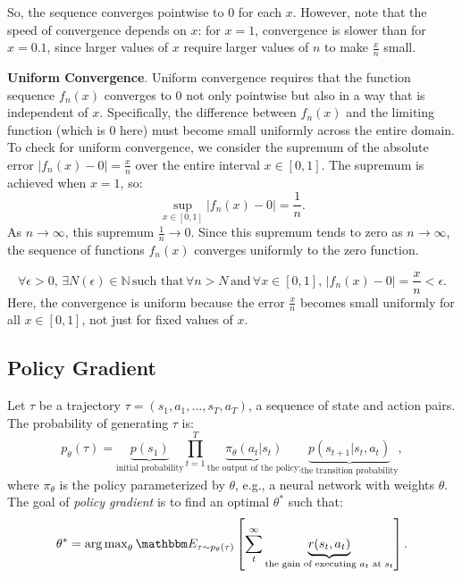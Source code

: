     So, the sequence converges pointwise to 0 for each $ x $. However, note that the speed of convergence depends on $ x $: for $ x = 1 $, convergence is slower than for $ x = 0.1 $, since larger values of $ x $ require larger values of $ n $ to make $ \frac{x}{n} $ small.
    
    \textbf{Uniform Convergence}.
    Uniform convergence requires that the function sequence $ f_n(x) $ converges to 0 not only pointwise but also in a way that is independent of $ x $. Specifically, the difference between $ f_n(x) $ and the limiting function (which is 0 here) must become small uniformly across the entire domain.
    To check for uniform convergence, we consider the supremum of the absolute error $ |f_n(x) - 0| = \frac{x}{n} $ over the entire interval $ x \in [0, 1] $.
    The supremum is achieved when $ x = 1 $, so:
    \begin{equation}
    \sup_{x \in [0, 1]} |f_n(x) - 0| = \frac{1}{n}.
    \end{equation}
    As $ n \to \infty $, this supremum $ \frac{1}{n} \to 0 $.
    Since this supremum tends to zero as $ n \to \infty $, the sequence of functions $ f_n(x) $ converges uniformly to the zero function.
    
    \begin{equation}
    \forall \epsilon > 0, \, \exists N(\epsilon) \in \mathbb{N} \, \text{such that} \, \forall n > N \, \text{and} \, \forall x \in [0, 1], \, |f_n(x) - 0| = \frac{x}{n} < \epsilon.
    \end{equation}
    Here, the convergence is uniform because the error $ \frac{x}{n} $ becomes small uniformly for all $ x \in [0, 1] $, not just for fixed values of $ x $.
    



    
\subsection{Policy Gradient}
Let $\tau$ be a trajectory $\tau = (s_1, a_1, \ldots, s_T, a_T)$, a sequence of state and action pairs. 
The probability of generating $\tau$ is:
    \begin{equation}
        p_{\theta}(\tau) = \underbrace{p(s_1)}_{\text{initial probability}} \prod_{t=1}^{T}{ \underbrace{\pi_{\theta}(a_t | s_t)}_{\text{the output of the policy;}} \underbrace{p(s_{t+1} | s_t, a_t)}_{\text{the transition probability}}},
    \end{equation}
where $\pi_{\theta}$ is the policy parameterized by $\theta$, e.g., a neural network with weights $\theta$.
The goal of \emph{policy gradient} is to find an optimal $\theta^\ast$ such that:
    \begin{equation}
        \theta^\ast = \argmax_{\theta} \E_{\tau \sim p_\theta(\tau)}\left[ \sum_{t}^{\infty}{\underbrace{r(s_t, a_t)}_{\text{the gain of executing $a_t$ at $s_t$}}} \right].
    \end{equation}
    
